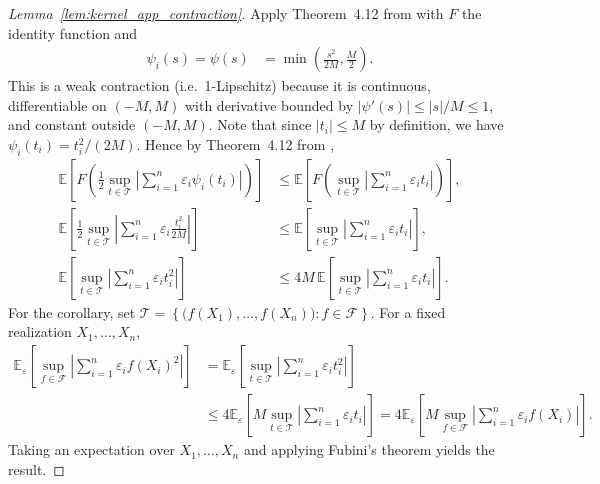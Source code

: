 \documentclass[11pt,lof]{puthesis}
\newcommand{\E}{\ensuremath{\mathbb{E}}}
\newcommand{\cF}{\ensuremath{\mathcal{F}}}
\newcommand{\cT}{\ensuremath{\mathcal{T}}}
\theoremstyle{break}
\theoremstyle{proof}
\newtheorem{proof}{Proof}
\begin{document}
\begin{proof}[Lemma~\ref{lem:kernel_app_contraction}]

  Apply Theorem~4.12 from \citet{ledoux1991probability} with $F$ the identity
  function and
  \begin{align*}
    \psi_i(s)
    = \psi(s)
    &=
    \min
    \left(
      \frac{s^2}{2M},
      \frac{M}{2}
    \right).
  \end{align*}
  This is a weak contraction
  (i.e.\ 1-Lipschitz)
  because it is continuous,
  differentiable on $(-M,M)$
  with derivative bounded by
  $|\psi'(s)| \leq |s|/M \leq 1$,
  and constant outside $(-M,M)$.
  Note that since $|t_i| \leq M$
  by definition,
  we have $\psi_i(t_i) = t_i^2 / (2M)$.
  Hence
  by Theorem~4.12
  from \citet{ledoux1991probability},
  \begin{align*}
    \E
    \left[
      F
      \left(
        \frac{1}{2}
        \sup_{t \in \cT}
        \left|
        \sum_{i=1}^n
        \varepsilon_i
        \psi_i(t_i)
        \right|
      \right)
    \right]
    &\leq
    \E
    \left[
      F
      \left(
        \sup_{t \in \cT}
        \left|
        \sum_{i=1}^n
        \varepsilon_i
        t_i
        \right|
      \right)
    \right], \\
    \E
    \left[
      \frac{1}{2}
      \sup_{t \in \cT}
      \left|
      \sum_{i=1}^n
      \varepsilon_i
      \frac{t_i^2}{2M}
      \right|
    \right]
    &\leq
    \E
    \left[
      \sup_{t \in \cT}
      \left|
      \sum_{i=1}^n
      \varepsilon_i
      t_i
      \right|
    \right], \\
    \E
    \left[
      \sup_{t \in \cT}
      \left|
      \sum_{i=1}^n
      \varepsilon_i
      t_i^2
      \right|
    \right]
    &\leq
    4M \,
    \E
    \left[
      \sup_{t \in \cT}
      \left|
      \sum_{i=1}^n
      \varepsilon_i
      t_i
      \right|
    \right].
  \end{align*}
  For the corollary, set
  $\cT = \left\{\big(f(X_1), \ldots, f(X_n)\big) : f \in \cF\right\}$.
  For a fixed realization
  $X_1, \ldots, X_n$,
  \begin{align*}
    \E_\varepsilon
    \left[
      \sup_{f \in \cF}
      \left|
      \sum_{i=1}^n
      \varepsilon_i
      f(X_i)^2
      \right|
    \right]
    &=
    \E_\varepsilon
    \left[
      \sup_{t \in \cT}
      \left|
      \sum_{i=1}^n
      \varepsilon_i
      t_i^2
      \right|
    \right] \\
    &\leq 4
    \E_\varepsilon
    \left[
      M
      \sup_{t \in \cT}
      \left|
      \sum_{i=1}^n
      \varepsilon_i
      t_i
      \right|
    \right]
    = 4 \E_\varepsilon
    \left[
      M
      \sup_{f \in \cF}
      \left|
      \sum_{i=1}^n
      \varepsilon_i
      f(X_i)
      \right|
    \right].
  \end{align*}
  Taking an expectation over $X_1, \ldots, X_n$
  and applying Fubini's theorem yields the result.
\end{proof}
\end{document}
